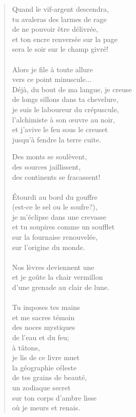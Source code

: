\documentclass[twocolumn,11pt]{article}
\begin{document}
\begin{verse}
Quand le vif-argent descendra,\\
tu avaleras des larmes de rage\\
de ne pouvoir être délivrée, \\
et ton encre renversée sur la page\\
sera le soir sur le champ givré!\\
\ \\

Alors je file à toute allure\\
vers ce point minuscule...\\
Déjà, du bout de ma langue, je creuse\\
de longs sillons dans ta chevelure,\\
je suis le laboureur du crépuscule,\\
l'alchimiste à son {\oe}uvre au noir,\\
et j'avive le feu sous le creuset\\
jusqu'à fendre la terre cuite.\\

\newpage

Des monts se soulèvent, \\
des sources jaillissent, \\
des continents se fracassent!\\
\ \\

Étourdi au bord du gouffre\\
(est-ce le sel ou le soufre?),\\
je m'éclipse dans une crevasse\\
et tu soupires comme un soufflet\\
sur la fournaise renouvelée,\\
sur l'origine du monde.\\
\ \\

Nos lèvres deviennent une\\
et je goûte la chair vermillon\\
d'une grenade au clair de lune.\\
\ \\

Tu imposes tes mains\\
et me sacres témoin\\
des noces mystiques\\
de l'eau et du feu;\\
à tâtons,\\
je lis de ce livre muet\\
la géographie céleste\\
de tes grains de beauté,\\
un zodiaque secret\\
sur ton corps d'ambre lisse\\
où je meurs et renais.
\end{verse}
\end{document}
